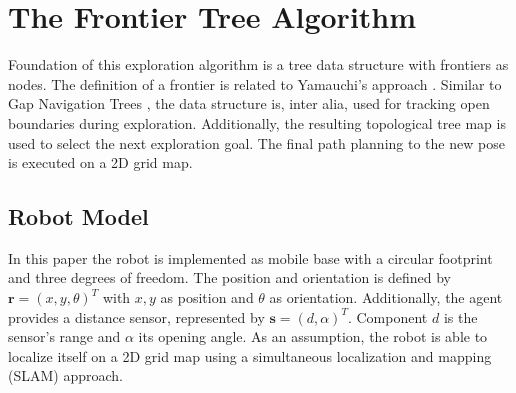 \documentclass[twocolumn]{svjour3}[2016]
\begin{document}
\section{The Frontier Tree Algorithm}
\label{tfta}

Foundation of this exploration algorithm is a tree data structure with frontiers as nodes. The definition of a frontier is related to Yamauchi's approach \cite{brian_yamauchi_frontier-based_2007}. Similar to Gap Navigation Trees \cite{benjamin_tovar_optimal_2003}, the data structure is, inter alia, used for tracking open boundaries during exploration. Additionally, the resulting topological tree map is used to select the next exploration goal. The final path planning to the new pose is executed on a 2D grid map.


\subsection{Robot Model}
In this paper the robot is implemented as mobile base with a circular footprint and three degrees of freedom. The position and orientation is defined by $\textbf{r} = (x, y, \theta)^{T}$ with $x, y$ as position and $\theta$ as orientation. Additionally, the agent provides a distance sensor, represented by $\textbf{s} = (d, \alpha)^{T}$. Component $d$ is the sensor's range and $\alpha$ its opening angle. As an assumption, the robot is able to localize itself on a 2D grid map using a simultaneous localization and mapping (SLAM) approach.
\end{document}
